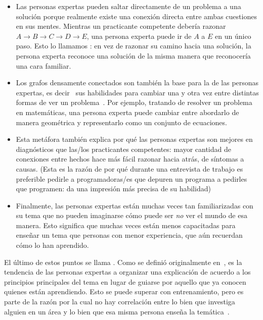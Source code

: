 \begin{itemize}

\item
  Las personas expertas pueden saltar directamente de un problema a una solución
  porque realmente existe una conexión directa entre ambas cuestiones en sus mentes.
  Mientras un practicante competente debería razonar
  $A{\rightarrow}B{\rightarrow}C{\rightarrow}D{\rightarrow}E$,
  una persona experta puede ir de $A$ a $E$ en un único paso.
  Esto lo llamamos :
  en vez de razonar su camino hacia una solución,
  la persona experta reconoce una solución de la misma manera que reconocería una cara familiar.

\item
  Los grafos densamente conectados son también la base para la 
   de las personas expertas,
 es decir \ sus habilidades para cambiar una y otra vez entre distintas formas de ver un problema~\cite{Petr2016}.
  Por ejemplo,
  tratando de resolver un problema en matemáticas,
  una persona experta puede cambiar entre abordarlo de manera geométrica 
  y representarlo como un conjunto de ecuaciones.

\item
  Esta metáfora también explica por qué las personas expertas son mejores en diagnósticos que las/los practicantes competentes:
 mayor cantidad de conexiones entre hechos hace más fácil razonar hacia atrás, de síntomas a causas.
  (Esta es la razón de por qué durante una entrevista de trabajo es preferible pedirle a programadoras/es que depuren un programa a pedirles que programen: da una impresión más precisa de su habilidad)

\item
  Finalmente,
  las personas expertas están muchas veces tan familiarizadas con su tema que
  no pueden imaginarse cómo puede ser \emph{no} ver el mundo de esa manera.
  Esto significa que muchas veces están menos capacitadas para enseñar un tema que  personas con menor experiencia, 
  que aún recuerdan cómo lo han aprendido.

\end{itemize}

El último de estos puntos se llama .
Como se definió originalmente en~\cite{Nath2003},
es la tendencia de las personas expertas a organizar una explicación de acuerdo a los principios principales del tema
en lugar de guiarse por aquello que ya conocen quienes están aprendiendo.
Esto se puede superar con entrenamiento,
pero es parte de la razón por la cual no hay correlación entre
lo bien que investiga alguien en un área
y lo bien que esa misma persona enseña la temática~\cite{Mars2002}.

